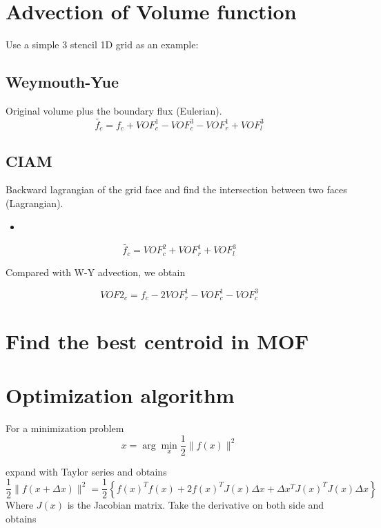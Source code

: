 \documentclass{article}
\begin{document}
\section{Advection of Volume function}
Use a simple 3 stencil 1D grid as an example:


\subsection{Weymouth-Yue}
Original volume plus the boundary flux (Eulerian).
\begin{equation}
  \label{eq:wy}
  \tilde{f_{c}} = f_{c} + VOF^{1}_{c} - VOF^{3}_{c} - VOF^{1}_{r} + VOF^{3}_{l}
\end{equation}

\subsection{CIAM}
Backward lagrangian of the grid face and find the intersection between
two faces (Lagrangian).

\begin{itemize}
  \item 
\end{itemize}

\begin{equation}
  \label{eq:CIAM}
  \tilde{f_{c}} = VOF^{2}_{c} + VOF^{1}_{r} + VOF^{3}_{l}
\end{equation}

Compared with W-Y advection, we obtain

\begin{equation}
  \label{eq:CIAM}
  VOF2_{c} = f_{c} - 2 VOF^{1}_{r} - VOF^{1}_{c} - VOF^{3}_{c}
\end{equation}

\section{Find the best centroid in MOF}

\section{Optimization algorithm}

For a minimization problem
\begin{equation}
\label{min}
x=\arg \min _{x} \frac{1}{2}\|f(x)\|^{2}
\end{equation}

expand with Taylor series and obtains
\begin{equation}
\label{taylor}
\frac{1}{2}\|f(x+\Delta x)\|^{2}=\frac{1}{2}\left\{f(x)^{T} f(x)+2 f(x)^{T} J(x) \Delta x+\Delta x^{T} J(x)^{T} J(x) \Delta x\right\}
\end{equation}
Where $J(x)$ is the Jacobian matrix.
Take the derivative on both side and obtains
\end{document}
